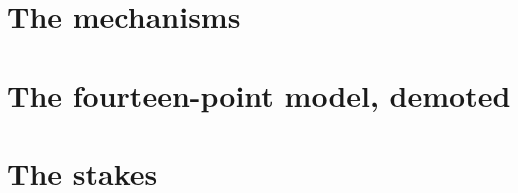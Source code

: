 \section{The mechanisms}

%
%

\section{The fourteen-point model, demoted}

%
%

\section{The stakes}

%
%
